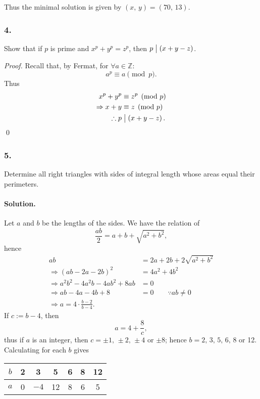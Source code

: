 Thus the minimal solution is given by $\left(x,\,y\right)=\left(70,\,13\right)$.

\subsubsection{4.} Show that if $p$ is prime and $x^p+y^p=z^p$, then $p \bigm| \left(x+y-z\right)$.

\begin{proof}
    Recall that, by Fermat, for $\forall a \in \mathbb{Z}$:
    \[
        a^p \equiv a \pmod{p}.
    \]
    Thus
    \begin{align*}
        x^p+y^p&\equiv z^p \pmod{p} \\
        \Rightarrow x+y&\equiv z \pmod{p} \\
        \therefore p &\bigm| \left(x+y-z\right).
    \end{align*}
    \qed
\end{proof}

\subsubsection{5.} Determine all right triangles with sides of integral length whose areas equal their perimeters.

\paragraph{Solution.} Let $a$ and $b$ be the lengths of the sides. We have the relation of
\[
    \frac{ab}{2}=a+b+\sqrt{a^2+b^2},
\]
hence
\begin{align*}
    ab &= 2a + 2b + 2\sqrt{a^2+b^2} \\
    \Rightarrow\left(ab-2a-2b\right)^2 &= 4a^2+4b^2 \\
    \Rightarrow a^2b^2-4a^2b-4ab^2+8ab &= 0 \\
    \Rightarrow ab - 4a - 4b + 8 &= 0 \qquad \because ab \neq 0 \\
    \Rightarrow a=4\cdot\frac{b-2}{b-4}.
\end{align*}
If $c:=b-4$, then
\[
    a=4+\frac{8}{c},
\]
thus if $a$ is an integer, then $c=\pm 1,\,\pm 2,\,\pm 4$ or $\pm 8$; hence
$b=2,\,3,\,5,\,6,\,8$ or 12. Calculating for each $b$ gives

\begin{center}
    \begin{tabular}{c|cccccc}
        \hline
        $b$ & 2 & 3 & 5 & 6 & 8 & 12 \\
        \hline
        $a$ & 0 & $-4$ & 12 & 8 & 6 & 5 \\
        \hline
    \end{tabular}
\end{center}

